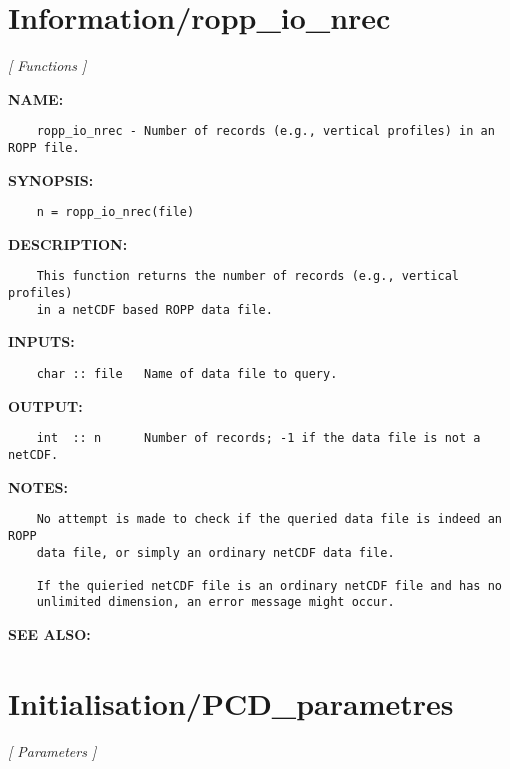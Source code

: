 \section{Information/ropp\_io\_nrec}
\textsl{[ Functions ]}

\label{ch:robo64}
\label{ch:Information_ropp_io_nrec}
\textbf{NAME:}\hspace{0.08in}\begin{Verbatim}
    ropp_io_nrec - Number of records (e.g., vertical profiles) in an ROPP file.
\end{Verbatim}
\textbf{SYNOPSIS:}\hspace{0.08in}\begin{Verbatim}
    n = ropp_io_nrec(file)
\end{Verbatim}
\textbf{DESCRIPTION:}\hspace{0.08in}\begin{Verbatim}
    This function returns the number of records (e.g., vertical profiles)
    in a netCDF based ROPP data file. 
\end{Verbatim}
\textbf{INPUTS:}\hspace{0.08in}\begin{Verbatim}
    char :: file   Name of data file to query.
\end{Verbatim}
\textbf{OUTPUT:}\hspace{0.08in}\begin{Verbatim}
    int  :: n      Number of records; -1 if the data file is not a netCDF.
\end{Verbatim}
\textbf{NOTES:}\hspace{0.08in}\begin{Verbatim}
    No attempt is made to check if the queried data file is indeed an ROPP
    data file, or simply an ordinary netCDF data file.

    If the quieried netCDF file is an ordinary netCDF file and has no
    unlimited dimension, an error message might occur.
\end{Verbatim}
\textbf{SEE ALSO:}\hspace{0.08in}\section{Initialisation/PCD\_parametres}
\textsl{[ Parameters ]}

